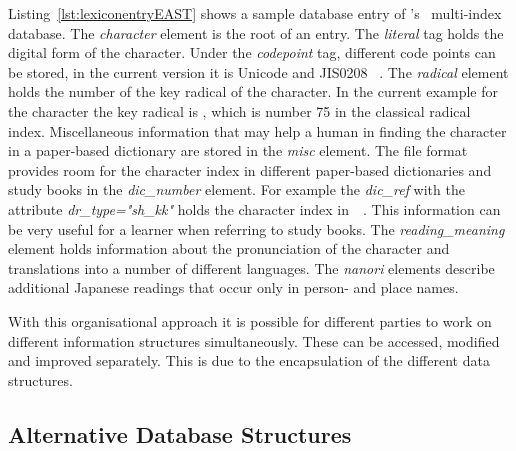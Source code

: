 Listing~\ref{lst:lexiconentryEAST} shows a sample database entry of 
's~\citeyear{Breen2004} 
multi-index database.
The \emph{character} element is the root of an entry. The \emph{literal} tag 
holds the digital form of the character. Under the \emph{codepoint} tag, 
different code points can be stored, in the current version it is Unicode and 
JIS0208 ~. 
The \emph{radical} element holds the number of the key radical of the character.
In the current example for the character  the key radical is ,
which is number 75 in the classical radical index.
Miscellaneous information that may help a human in finding the character in a 
paper-based dictionary are stored in the \emph{misc} element.
The file format provides room for the character index in different paper-based
dictionaries and study books in the \emph{dic\_number} element. For example 
the \emph{dic\_ref} with the attribute \emph{dr\_type="sh\_kk"} holds the
character index in~~\citeyear{Hadamitzky1995}. This information can be very
useful for a learner when referring to study books. The \emph{reading\_meaning}
element holds information about the pronunciation of the character and 
translations into a number of different languages. The \emph{nanori} elements
describe additional Japanese readings that occur only in person- and place names.

With this organisational approach it is possible for different parties to work 
on different information structures simultaneously. These can be accessed,
modified and improved separately. This is due to the encapsulation of the 
different data structures.

\begin{xmlcode}
  id,level,labelSrcRef,labelType,traceRef,from,to},%
                   emphstyle={[2]\color{red}},
                   caption={Sample lexicon entry for lexical data},
                   label=lst:lexiconentryEAST]
                   {chapters/codeSamples/EAST.xml}
\end{xmlcode}

\subsection{Alternative Database Structures}
\label{sec:hwre:alternativedatabasestructures}

